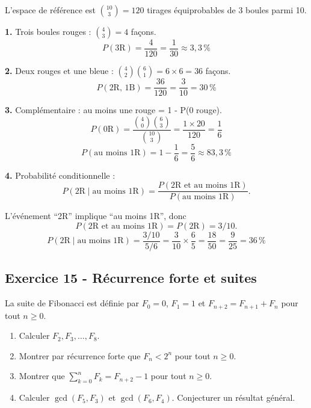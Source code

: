 \documentclass[12pt,a4paper]{article}
\begin{document}
\begin{boitecorrige}
L'espace de référence est $\binom{10}{3} = 120$ tirages équiprobables de 3 boules parmi 10.

\textbf{1.} Trois boules rouges : $\binom{4}{3} = 4$ façons.
\[
P(\text{3R}) = \frac{4}{120} = \frac{1}{30} \approx 3{,}3\,\%
\]

\textbf{2.} Deux rouges et une bleue : $\binom{4}{2}\binom{6}{1} = 6\times6 = 36$ façons.
\[
P(\text{2R, 1B}) = \frac{36}{120} = \frac{3}{10} = 30\,\%
\]

\textbf{3.} Complémentaire : au moins une rouge = 1 - P(0 rouge).
\[
P(\text{0R}) = \frac{\binom{4}{0}\binom{6}{3}}{\binom{10}{3}} = \frac{1\times20}{120} = \frac{1}{6}
\]
\[
P(\text{au moins 1R}) = 1 - \frac{1}{6} = \frac{5}{6} \approx 83{,}3\,\%
\]

\textbf{4.} Probabilité conditionnelle :
\[
P(\text{2R} \mid \text{au moins 1R}) = \frac{P(\text{2R et au moins 1R})}{P(\text{au moins 1R})}.
\]

L'événement ``2R'' implique ``au moins 1R'', donc
\[
P(\text{2R et au moins 1R}) = P(\text{2R}) = 3/10.
\]
\[
P(\text{2R} \mid \text{au moins 1R}) = \frac{3/10}{5/6} = \frac{3}{10}\times\frac{6}{5} = \frac{18}{50} = \frac{9}{25} = 36\,\%
\]
\end{boitecorrige}

\subsection*{Exercice 15 - Récurrence forte et suites \niveau{\difficile}}

\begin{boiteexercice}
La suite de Fibonacci est définie par $F_0 = 0$, $F_1 = 1$ et $F_{n+2} = F_{n+1} + F_n$ pour tout $n \geq 0$.
\begin{enumerate}
  \item Calculer $F_2, F_3, \ldots, F_8$.
  \item Montrer par récurrence forte que $F_n < 2^n$ pour tout $n \geq 0$.
  \item Montrer que $\sum_{k=0}^{n} F_k = F_{n+2} - 1$ pour tout $n\geq0$.
  \item Calculer $\gcd(F_5, F_3)$ et $\gcd(F_6, F_4)$. Conjecturer un résultat général.
\end{enumerate}
\end{boiteexercice}
\end{document}
